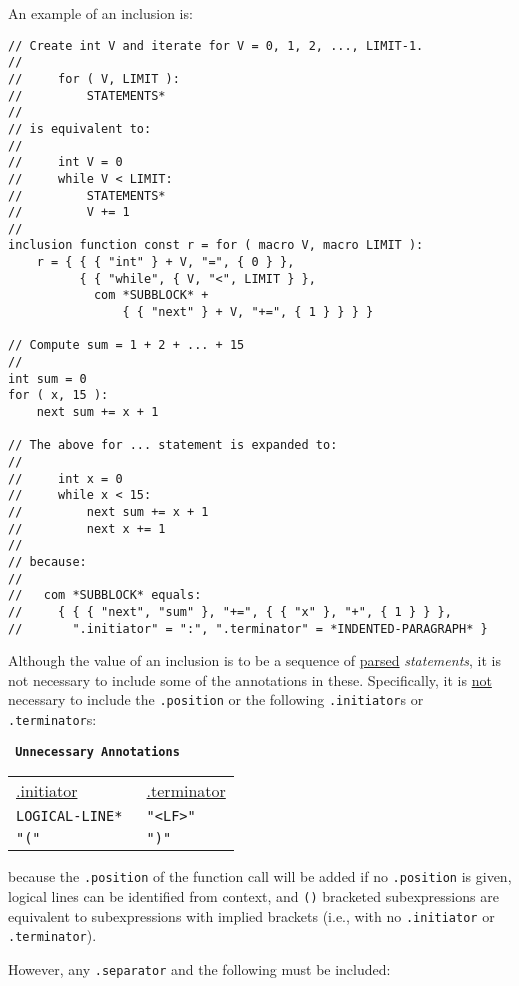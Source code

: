 \documentclass[12pt]{article}
\newenvironment{indpar}[1][0.3in]%
	{\begin{list}{}%
		     {\setlength{\itemsep}{0in}%
		      \setlength{\topsep}{0in}%
		      \setlength{\parsep}{1ex}%
		      \setlength{\labelwidth}{#1}%
		      \setlength{\leftmargin}{#1}%
		      \addtolength{\leftmargin}{\labelsep}}%
	 \item}%
	{\end{list}}
\begin{document}
An example of an inclusion is:
\begin{indpar}[1em]\begin{verbatim}
// Create int V and iterate for V = 0, 1, 2, ..., LIMIT-1.
//
//     for ( V, LIMIT ):
//         STATEMENTS*
//
// is equivalent to:
//
//     int V = 0
//     while V < LIMIT:
//         STATEMENTS*
//         V += 1
//
inclusion function const r = for ( macro V, macro LIMIT ):
    r = { { { "int" } + V, "=", { 0 } },
          { { "while", { V, "<", LIMIT } },
            com *SUBBLOCK* +
                { { "next" } + V, "+=", { 1 } } } }

// Compute sum = 1 + 2 + ... + 15
//
int sum = 0
for ( x, 15 ):
    next sum += x + 1

// The above for ... statement is expanded to:
//
//     int x = 0
//     while x < 15:
//         next sum += x + 1
//         next x += 1
//
// because:
//
//   com *SUBBLOCK* equals:
//     { { { "next", "sum" }, "+=", { { "x" }, "+", { 1 } } },
//       ".initiator" = ":", ".terminator" = *INDENTED-PARAGRAPH* }
\end{verbatim}\end{indpar}

Although the value of an inclusion is to be a sequence of
\underline{parsed} {\em statements}, it is not necessary to
include some of the annotations in these.
Specifically, it is \underline{not} necessary to
include the {\tt .position} or
the following {\tt .initiator}s or {\tt .terminator}s:

\begin{center} \tt
{\rm \bf Unnecessary Annotations}\label{UNNECESSARY-ANNOTATIONS}
\\[1ex]
\begin{tabular}{l@{~~~~~~~~~~}l}
\underline{.initiator} & \underline{.terminator}
\\[1ex]
\tt *LOGICAL-LINE* & \tt "<LF>" \\
\tt "(" & \tt ")" \\
\end{tabular}
\end{center}

because the {\tt .position} of the function call will be added
if no {\tt .position} is given,
logical lines can be identified from context, and
{\tt ()} bracketed subexpressions are equivalent to
subexpressions with implied brackets (i.e., with no
{\tt .initiator} or {\tt .terminator}).

However, any {\tt .separator} and the following must be included:
\end{document}
